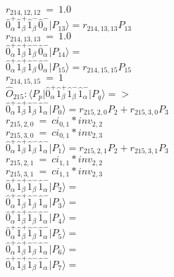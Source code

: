 \documentclass[14pt]{article}
\begin{document}
    ${r}_{214,12,12}\ =\ 1.0 $ \\ 
    $ \hat{0}_{\alpha}^{+}\hat{1}_{\beta}^{+}\hat{1}_{\beta}^{-}\hat{0}_{\alpha}^{-} \vert{P_{13}}\rangle = {r}_{214,13,13}P_{13} $ \\ 
    ${r}_{214,13,13}\ =\ 1.0 $ \\ 
    $ \hat{0}_{\alpha}^{+}\hat{1}_{\beta}^{+}\hat{1}_{\beta}^{-}\hat{0}_{\alpha}^{-} \vert{P_{14}}\rangle =  $ \\ 
    $ \hat{0}_{\alpha}^{+}\hat{1}_{\beta}^{+}\hat{1}_{\beta}^{-}\hat{0}_{\alpha}^{-} \vert{P_{15}}\rangle = {r}_{214,15,15}P_{15} $ \\ 
    ${r}_{214,15,15}\ =\ 1 $ \\ 
    
    $\hat{O}_{215}:  \langle{P_p}\vert \hat{0}_{\alpha}^{+}\hat{1}_{\beta}^{+}\hat{1}_{\beta}^{-}\hat{1}_{\alpha}^{-} \vert{P_q}\rangle => $ \\ 
    $ \hat{0}_{\alpha}^{+}\hat{1}_{\beta}^{+}\hat{1}_{\beta}^{-}\hat{1}_{\alpha}^{-} \vert{P_{0}}\rangle = {r}_{215,2,0}P_{2}+{r}_{215,3,0}P_{3} $ \\ 
    ${r}_{215,2,0}\ =\ {ci}_{0,1}*{inv}_{2,2} $ \\ 
    ${r}_{215,3,0}\ =\ {ci}_{0,1}*{inv}_{2,3} $ \\ 
    $ \hat{0}_{\alpha}^{+}\hat{1}_{\beta}^{+}\hat{1}_{\beta}^{-}\hat{1}_{\alpha}^{-} \vert{P_{1}}\rangle = {r}_{215,2,1}P_{2}+{r}_{215,3,1}P_{3} $ \\ 
    ${r}_{215,2,1}\ =\ {ci}_{1,1}*{inv}_{2,2} $ \\ 
    ${r}_{215,3,1}\ =\ {ci}_{1,1}*{inv}_{2,3} $ \\ 
    $ \hat{0}_{\alpha}^{+}\hat{1}_{\beta}^{+}\hat{1}_{\beta}^{-}\hat{1}_{\alpha}^{-} \vert{P_{2}}\rangle =  $ \\ 
    $ \hat{0}_{\alpha}^{+}\hat{1}_{\beta}^{+}\hat{1}_{\beta}^{-}\hat{1}_{\alpha}^{-} \vert{P_{3}}\rangle =  $ \\ 
    $ \hat{0}_{\alpha}^{+}\hat{1}_{\beta}^{+}\hat{1}_{\beta}^{-}\hat{1}_{\alpha}^{-} \vert{P_{4}}\rangle =  $ \\ 
    $ \hat{0}_{\alpha}^{+}\hat{1}_{\beta}^{+}\hat{1}_{\beta}^{-}\hat{1}_{\alpha}^{-} \vert{P_{5}}\rangle =  $ \\ 
    $ \hat{0}_{\alpha}^{+}\hat{1}_{\beta}^{+}\hat{1}_{\beta}^{-}\hat{1}_{\alpha}^{-} \vert{P_{6}}\rangle =  $ \\ 
    $ \hat{0}_{\alpha}^{+}\hat{1}_{\beta}^{+}\hat{1}_{\beta}^{-}\hat{1}_{\alpha}^{-} \vert{P_{7}}\rangle =  $ \\ 
\end{document}
